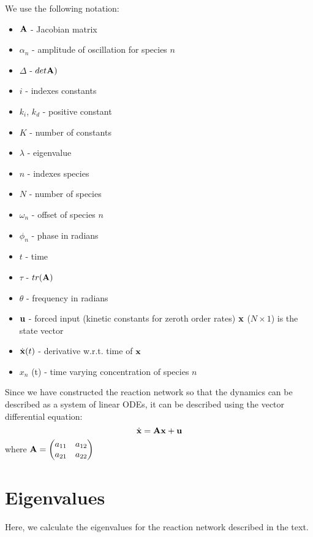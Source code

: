 \documentclass[11pt]{article}
\begin{document}
We use the following notation: 
\begin{itemize}
\item \({\bf A}\) - Jacobian matrix
\item \(\alpha_n\) - amplitude of oscillation for species \(n\)
\item \(\Delta\) -
\(det {\bf A})\)
\item \(i\) - indexes constants
\item \(k_i\), \(k_d\) -
positive constant 
\item \(K\) - number of constants
\item \(\lambda\) -
eigenvalue
\item \(n\) - indexes species
\item \(N\) - number of species
\item \(\omega_n\) - offset of species \(n\) 
\item \(\phi_n\) - phase in radians
\item \(t\) - time 
\item \(\tau\) - \(tr({\bf A})\) 
\item \(\theta\) - frequency in
radians 
\item \({\bf u}\) - forced input (kinetic constants for zeroth order
rates)  \({\bf x}\) (\(N \times 1\)) is the state vector
\item \(\dot{\bf x} (t)\) - derivative w.r.t. time of \({\bf x}\)
\item \(x_n\)
(t) - time varying concentration of species \(n\)
\end{itemize}

    Since we have constructed the reaction network so that the dynamics can
be described as a system of linear ODEs, it can be described using the
vector differential equation: \begin{equation}
\dot{\bf x} = {\bf A} {\bf x} + {\bf u}\label{eq:linear}
\end{equation} where
\({\bf A} = \begin{pmatrix} a_{11} & a_{12} \\ a_{21} & a_{22} \\ \end{pmatrix}\)

\section{Eigenvalues}
Here, we calculate the eigenvalues for the reaction network described
in the text.
\end{document}
